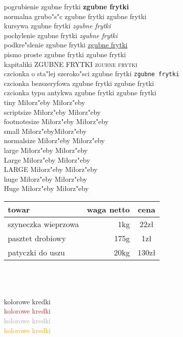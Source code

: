 \documentclass[12pt,twoside,a4paper,twocolumn]{article}
\begin{document}
pogrubienie \textbf{} zgubne frytki \textbf{zgubne frytki}\\
normalna grubo"s"c \textmd{} zgubne frytki \textmd{zgubne frytki}\\
kursywa \textit{} zgubne frytki \textit{zgubne frytki}\\
pochylenie \textsl{} zgubne frytki \textsl{zgubne frytki}\\
podkre"slenie  \underline{} zgubne frytki \underline{zgubne frytki}\\
pismo proste \textup{} zgubne frytki \textup{zgubne frytki}\\
kapitaliki \textsc{} ZGUBNE FRYTKI \textsc{zgubne frytki}\\
czcionka o sta"lej szeroko"sci \texttt{} zgubne frytki \texttt{zgubne frytki}\\
czcionka bezszeryfowa \textsf{} zgubne frytki \textsf{zgubne frytki}\\
czcionka typu antykwa \textrm{} zgubne frytki \textrm{zgubne frytki}\\

tiny Miłorz"eby \tiny{Miłorz"eby}\\
scriptsize Miłorz"eby \scriptsize{Miłorz"eby}\\
footnotesize Miłorz"eby \footnotesize{Miłorz"eby}\\
small Miłorz"eby\small{Miłorz"eby}\\
normalsize Miłorz"eby \normalsize{Miłorz"eby}\\
large Miłorz"eby \large{Miłorz"eby}\\
Large Miłorz"eby \Large{Miłorz"eby}\\
LARGE Miłorz"eby \LARGE{Miłorz"eby}\\
huge Miłorz"eby \huge{Miłorz"eby}\\
Huge Miłorz"eby \Huge{Miłorz"eby}\\


\begin{tabular}{lr|c}
towar & waga netto & cena\\\hline
szyneczka wieprzowa & 1kg & 22zł\\
pasztet drobiowy & 175g & 1zł\\
patyczki do uszu & 20kg & 130zł
\end{tabular}
\\
\\
\\

\textcolor[RGB]{255,214,76}{kolorowe kredki}\\
\textcolor{brown}{kolorowe kredki}\\
\textcolor{darkgray}{kolorowe kredki}\\
\textcolor{orange}{kolorowe kredki}\\
\end{document}
